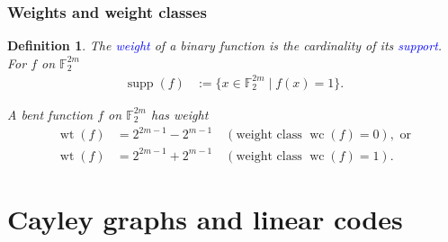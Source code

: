 \documentclass[pdf,sprung,slideColor,nocolorBG]{beamer}
\newenvironment{colortheme}[1]{
\def\ProvidesPackageRCS $##1${\relax}
\renewcommand{\ProcessOptions}{\relax}
\makeatletter

\makeatother
}{}
\newcommand{\mb}[1]{\mathbb{#1}}
\newcommand{\Emph}[1]{\emph{\textcolor{blue}{#1}}}
\newcommand{\Cay}[1]{\operatorname{Cay}\left(#1\right)}
\newcommand{\support}[1]{\operatorname{supp}\left(#1\right)}
\newcommand{\weight}[1]{\operatorname{wt}\left(#1\right)}
\newcommand{\weightclass}[1]{\operatorname{wc}\left(#1\right)}
\newcommand{\F}{\mb{F}}
\newtheorem{Def}{Definition}
\begin{document}
\begin{colortheme}{jubata}

\begin{frame}
\frametitle{Weights and weight classes}
\begin{Def}
The \Emph{weight} of a binary function is the cardinality of its \Emph{support}.
For $f$ on $\F_2^{2m}$
\begin{align*}
\support{f} &:= \{x \in \F_2^{2m} \mid f(x)=1 \}.
\end{align*}

A bent function $f$ on $\F_2^{2m}$ has weight
\begin{align*}
\weight{f} &= 2^{2 m - 1} - 2^{m-1} \quad (\text{weight class~} \weightclass{f}=0), \text{~or}
\\
\weight{f} &= 2^{2 m - 1} + 2^{m-1} \quad (\text{weight class~} \weightclass{f}=1).
\end{align*}
\end{Def}
\end{frame}

\end{colortheme}

\section{Cayley graphs and linear codes}
\end{document}
